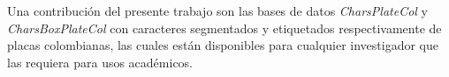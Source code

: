  \begin{tcolorbox}
[colback=green!5!white,colframe=green!45!black,fonttitle=\bfseries,title=Contribución]

   Una contribución del presente trabajo son las bases de datos \textit{CharsPlateCol} y \textit{CharsBoxPlateCol} con caracteres segmentados y etiquetados respectivamente de placas colombianas, las cuales están disponibles para cualquier investigador que las requiera para usos académicos.
\end{tcolorbox}\\


